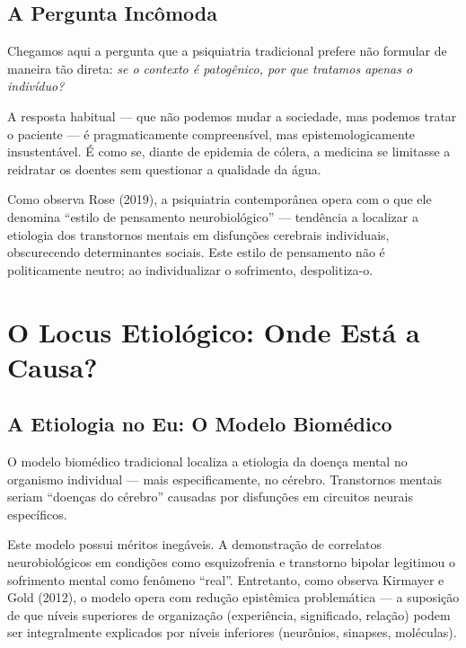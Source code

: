 \subsection{A Pergunta Incômoda}

Chegamos aqui a pergunta que a psiquiatria tradicional prefere não formular de maneira tão direta: \textit{se o contexto é patogênico, por que tratamos apenas o indivíduo?}

A resposta habitual --- que não podemos mudar a sociedade, mas podemos tratar o paciente --- é pragmaticamente compreensível, mas epistemologicamente insustentável. É como se, diante de epidemia de cólera, a medicina se limitasse a reidratar os doentes sem questionar a qualidade da água.

Como observa Rose (2019), a psiquiatria contemporânea opera com o que ele denomina \enquote{estilo de pensamento neurobiológico} --- tendência a localizar a etiologia dos transtornos mentais em disfunções cerebrais individuais, obscurecendo determinantes sociais. Este estilo de pensamento não é politicamente neutro; ao individualizar o sofrimento, despolitiza-o.

\section{O Locus Etiológico: Onde Está a Causa?}
\label{sec:locus-etiologico}

\subsection{A Etiologia no Eu: O Modelo Biomédico}

O modelo biomédico tradicional localiza a etiologia da doença mental no organismo individual --- mais especificamente, no cérebro. Transtornos mentais seriam \enquote{doenças do cérebro} causadas por disfunções em circuitos neurais específicos.

Este modelo possui méritos inegáveis. A demonstração de correlatos neurobiológicos em condições como esquizofrenia e transtorno bipolar legitimou o sofrimento mental como fenômeno \enquote{real}. Entretanto, como observa Kirmayer e Gold (2012), o modelo opera com redução epistêmica problemática --- a suposição de que níveis superiores de organização (experiência, significado, relação) podem ser integralmente explicados por níveis inferiores (neurônios, sinapses, moléculas).

